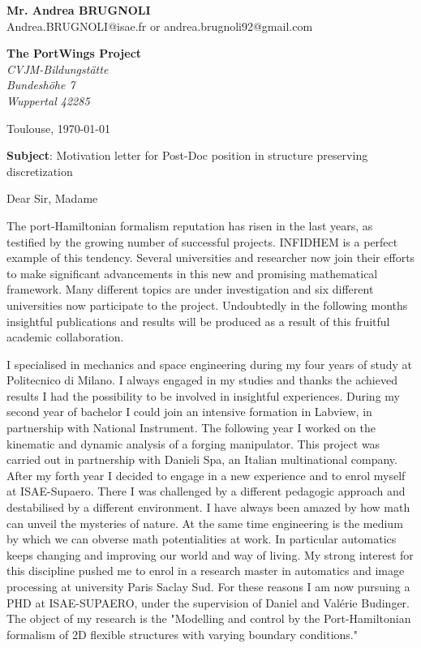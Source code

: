 \documentclass[11pt]{letter}
\begin{document}
 \begin{flushleft}
 {\bfseries Mr. Andrea \textsc{BRUGNOLI}}\\[.35ex]
 Andrea.BRUGNOLI@isae.fr or andrea.brugnoli92@gmail.com
 \end{flushleft}
 \begin{flushright}
 {\bfseries The PortWings Project}\\[.35ex]
 \small\itshape
 CVJM-Bildungstätte \\
Bundeshöhe 7 \\
Wuppertal 42285
 \end{flushright}
 \begin{flushright}
 Toulouse, \today 
 \end{flushright}
 \textbf{Subject}: Motivation letter for Post-Doc position in structure preserving discretization

 Dear Sir, Madame

The port-Hamiltonian formalism reputation has risen in the last years, as testified by the growing number of successful projects. INFIDHEM is a perfect example of this tendency. Several universities and researcher now join their efforts to make significant advancements in this new and promising mathematical framework. Many different topics are under investigation and six different universities now participate to the project. Undoubtedly in the following months insightful publications and results will be produced as a result of this fruitful academic collaboration.

 I specialised in mechanics and space engineering during my four years of study at Politecnico di Milano. I always engaged in my studies and thanks the achieved results I had the possibility to be involved in insightful experiences. During my second year of bachelor I could join an intensive formation in Labview, in partnership with National Instrument. The following year I worked on the kinematic and dynamic analysis of a forging manipulator. This project was carried out in partnership with Danieli Spa, an Italian multinational company.  After my forth year I decided to engage in a new experience and to enrol myself at ISAE-Supaero. There I was challenged by a different pedagogic approach and destabilised by a different environment.  I have always been amazed by how math can unveil the mysteries of nature. At the same time engineering is the medium by which we can obverse math potentialities at work. In particular automatics keeps changing and improving our world  and way of living. My strong interest for this discipline pushed me to enrol in a research master in automatics and image processing at university Paris Saclay Sud. For these reasons I am now pursuing a PHD at ISAE-SUPAERO, under the supervision of Daniel and Valérie Budinger. The object of my research is the "Modelling and control by the Port-Hamiltonian formalism of 2D flexible structures with varying boundary conditions."
\end{document}
